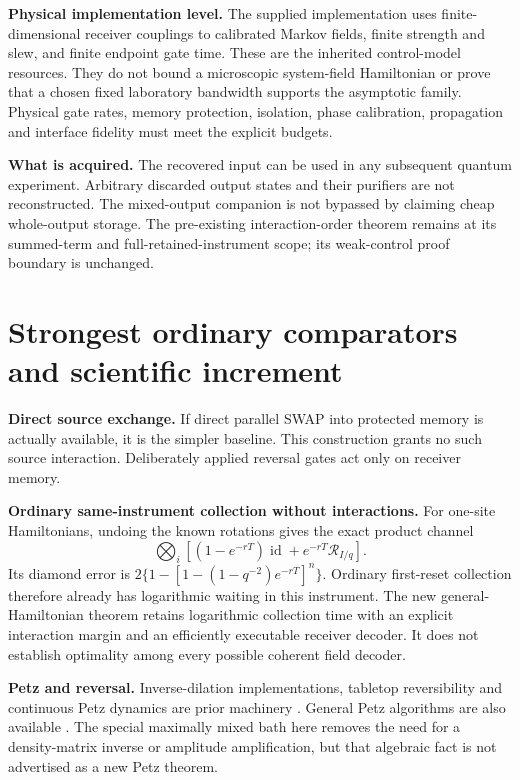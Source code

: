\documentclass[11pt,a4paper]{article}
\newcommand{\id}{\operatorname{id}}\newcommand{\Tr}{\operatorname{Tr}}\newcommand{\osc}{\operatorname{osc}}
\begin{document}
\textbf{Physical implementation level.} The supplied implementation uses finite-dimensional receiver couplings to calibrated Markov fields, finite strength and slew, and finite endpoint gate time. These are the inherited control-model resources. They do not bound a microscopic system-field Hamiltonian or prove that a chosen fixed laboratory bandwidth supports the asymptotic family. Physical gate rates, memory protection, isolation, phase calibration, propagation and interface fidelity must meet the explicit budgets.

\textbf{What is acquired.} The recovered input can be used in any subsequent quantum experiment. Arbitrary discarded output states and their purifiers are not reconstructed. The mixed-output companion is not bypassed by claiming cheap whole-output storage. The pre-existing interaction-order theorem remains at its summed-term and full-retained-instrument scope; its weak-control proof boundary is unchanged.

\section{Strongest ordinary comparators and scientific increment}

\textbf{Direct source exchange.} If direct parallel SWAP into protected memory is actually available, it is the simpler baseline. This construction grants no such source interaction. Deliberately applied reversal gates act only on receiver memory.

\textbf{Ordinary same-instrument collection without interactions.} For one-site Hamiltonians, undoing the known rotations gives the exact product channel
\begin{equation}
\bigotimes_i\left[(1-e^{-rT})\id+e^{-rT}\mathcal R_{I/q}\right].
\end{equation}
Its diamond error is $2\{1-[1-(1-q^{-2})e^{-rT}]^n\}$. Ordinary first-reset collection therefore already has logarithmic waiting in this instrument. The new general-Hamiltonian theorem retains logarithmic collection time with an explicit interaction margin and an efficiently executable receiver decoder. It does not establish optimality among every possible coherent field decoder.

\textbf{Petz and reversal.} Inverse-dilation implementations, tabletop reversibility and continuous Petz dynamics are prior machinery \cite{aw2024,song2026,kwon2022}. General Petz algorithms are also available \cite{gilyen2022}. The special maximally mixed bath here removes the need for a density-matrix inverse or amplitude amplification, but that algebraic fact is not advertised as a new Petz theorem.
\end{document}
